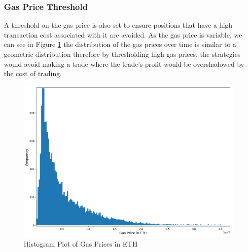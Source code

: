 \subsubsection{Gas Price Threshold}
A threshold on the gas price is also set to ensure positions that have a high transaction cost associated with it are avoided. As the gas price is variable, we can see in Figure \ref{fig:GasPriceHistogram} the distribution of the gas prices over time is similar to a geometric distribution therefore by thresholding high gas prices, the strategies would avoid making a trade where the trade's profit would be overshadowed by the cost of trading.
\begin{figure}[h!]
    \centering
    \includegraphics[width=0.7\linewidth]{evaluation/Images/GasPriceHistogram.png}
    \caption{Histogram Plot of Gas Prices in ETH}
    \label{fig:GasPriceHistogram}
\end{figure}


